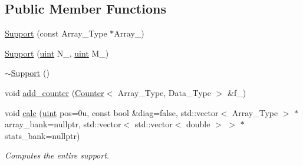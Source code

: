 \subsection*{Public Member Functions}
\begin{DoxyCompactItemize}
\item 
\hyperlink{classbarray_1_1_support_a594b9cf01893e23b57e86983ce2237d9}{Support} (const Array\+\_\+\+Type $\ast$Array\+\_\+)
\item 
\hyperlink{classbarray_1_1_support_a0ebc245e9510db0392761c0f0eed808c}{Support} (\hyperlink{namespacebarray_af9756a31953db233f80a9cfe1ef31c32}{uint} N\+\_\+, \hyperlink{namespacebarray_af9756a31953db233f80a9cfe1ef31c32}{uint} M\+\_\+)
\item 
\hyperlink{classbarray_1_1_support_a6f632bd62775de61278f6bee2a656bcd}{$\sim$\+Support} ()
\item 
void \hyperlink{classbarray_1_1_support_a9fc89bd8b15dcad6a4140a3c74073d10}{add\+\_\+counter} (\hyperlink{classbarray_1_1_counter}{Counter}$<$ Array\+\_\+\+Type, Data\+\_\+\+Type $>$ \&f\+\_\+)
\item 
void \hyperlink{classbarray_1_1_support_ab5261952be0746f188ee024e3e8c26c1}{calc} (\hyperlink{namespacebarray_af9756a31953db233f80a9cfe1ef31c32}{uint} pos=0u, const bool \&diag=false, std\+::vector$<$ Array\+\_\+\+Type $>$ $\ast$array\+\_\+bank=nullptr, std\+::vector$<$ std\+::vector$<$ double $>$ $>$ $\ast$stats\+\_\+bank=nullptr)
\begin{DoxyCompactList}\small\item\em Computes the entire support. \end{DoxyCompactList}\end{DoxyCompactItemize}
